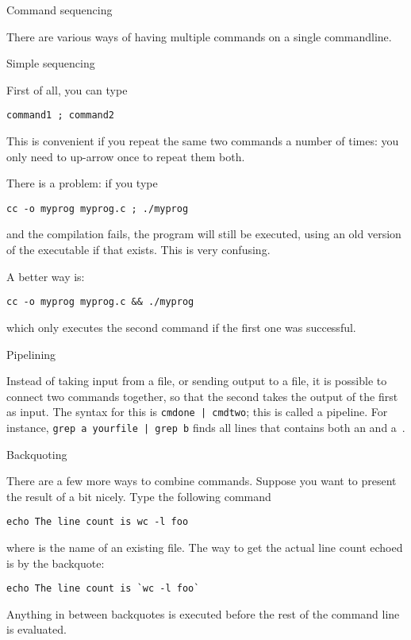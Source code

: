  {Command sequencing}
\label{tut:unix-bq}

There are various ways of having multiple commands on a single
commandline.

 {Simple sequencing}

First of all, you can type
\begin{verbatim}
command1 ; command2
\end{verbatim}
This is convenient if you repeat the same two commands a number of
times: you only need to up-arrow once to repeat them both.

There is a problem: if you type
\begin{verbatim}
cc -o myprog myprog.c ; ./myprog
\end{verbatim}
and the compilation fails, the program will still be executed,
using an old version of the executable if that exists. This is very
confusing.

A better way is:
\begin{verbatim}
cc -o myprog myprog.c && ./myprog
\end{verbatim}
which only executes the second command if the first one was
successful.

 {Pipelining}

Instead of taking input from a file, or sending output to a file, it
is possible to connect two commands together, so that the second takes
the output of the first as input. The syntax for this is
\verb+cmdone | cmdtwo+; this is called a pipeline. For instance,
\verb+grep a yourfile | grep b+ finds all lines that contains both an
 and a~.

{}{}

 {Backquoting}

There are a few more ways to combine commands. Suppose you want to
present the result of  a bit nicely. Type the following command
\begin{verbatim}
echo The line count is wc -l foo
\end{verbatim}
where  is the name of an existing file. The way to
get the actual line count echoed is by the backquote:
\begin{verbatim}
echo The line count is `wc -l foo`
\end{verbatim}
Anything in between backquotes is executed before the rest of the
command line is evaluated.


